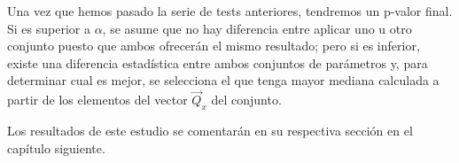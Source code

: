 Una vez que hemos pasado la serie de tests anteriores, tendremos un p-valor final. Si es superior a $\alpha$, se asume que no hay diferencia entre aplicar uno u otro conjunto puesto que ambos ofrecerán el mismo resultado; pero si es inferior, existe una diferencia estadística entre ambos conjuntos de parámetros y, para determinar cual es mejor, se selecciona el que tenga mayor mediana calculada a partir de los elementos del vector $\vec{Q}_x$ del conjunto.

Los resultados de este estudio se comentarán en su respectiva sección en el capítulo siguiente.